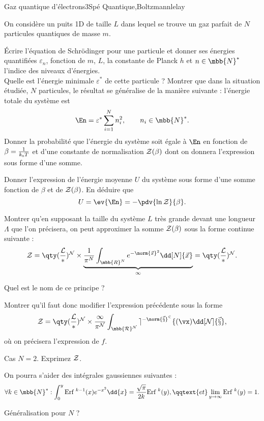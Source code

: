 \begin{exercise}{Gaz quantique d'électrons}{3}{Spé}
{Quantique,Boltzmann}{lelay}

On considère un puits 1D de taille $L$ dans lequel se trouve un gaz parfait de $N$ particules quantiques de masse $m$.

\begin{questions}
    \questioncours \'Ecrire l'équation de Schrödinger pour une particule et donner ses énergies quantifiées $\varepsilon_n$, fonction de $m$, $L$, la constante de Planck $h$ et $n\in\mbb{N}^\ast$ l'indice des niveaux d'énergies. \\
    Quelle est l'énergie minimale $\varepsilon^\ast$ de cette particule ?
    \question Montrer que dans la situation étudiée, $N$ particules, le résultat se généralise de la manière suivante : l'énergie totale du système est
    $$\En = \varepsilon^\ast\sum_{i=1}^{N} n_i^2, \qquad n_i\in\mbb{N}^\ast.$$
    \question Donner la probabilité que l'énergie du système soit égale à $\En$ en fonction de $\beta = \frac{1}{k_\textsc{b}T}$ et d'une constante de normalisation $\cal{Z}(\beta)$ dont on donnera l'expression sous forme d'une somme.
    
    \question Donner l'expression de l'énergie moyenne $U$ du système sous forme d'une somme fonction de $\beta$ et de $\cal{Z}(\beta)$. En déduire que
    $$U = \ev{\En} = -\pdv{\ln\cal{Z}}{\beta}.$$
    
    \question Montrer qu'en supposant la taille du système $L$ très grande devant une longueur $\Lambda$ que l'on précisera, on peut approximer la somme $\cal{Z}(\beta)$ sous la forme continue suivante :
    $$\cal{Z} = \qty(\dfrac{L}{\Lambda})^{N}\times \underset{1}{\underbrace{\dfrac{1}{\pi^{N}}\int_{\mbb{R}^{N}} e^{-\norm{\vec{x}}^2} \dd[N]{\vec{x}}}} = \qty(\dfrac{L}{\Lambda})^{N}.$$
    
    
    \question Quel est le nom de ce principe ?
    
    \question Montrer qu'il faut donc modifier l'expression précédente sous la forme
    $$\cal{Z} = \qty(\dfrac{L}{\Lambda})^{N}\times \dfrac{1}{\pi^{N}}\int_{\mbb{R}^{N}} e^{-\norm{\vec{x}}^2} f(\vx) \dd[N]{\vec{x}},$$
    où on précisera l'expression de $f$.
    
    \question Cas $N=2$. Exprimez $\cal{Z}$.
    
    On pourra s'aider des intégrales gaussiennes suivantes :
    $$\forall k\in\mbb{N}^\ast : \int_0^y \text{Erf }^{k-1}(x) e^{- x^2}\dd{x} = \dfrac{\sqrt{\pi}}{2k}\text{Erf }^k(y), \qqtext{et} \lim_{y\rightarrow\infty}\text{Erf }^k(y) = 1.$$
    
    \question Généralisation pour $N$ ?

    
\end{questions}

\end{exercise}